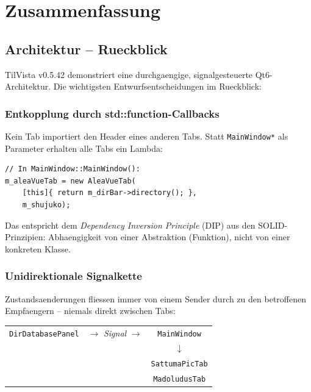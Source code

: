 \chapter{Zusammenfassung}

\section{Architektur -- Rueckblick}

TilVista v0.5.42 demonstriert eine durchgaengige,
signalgesteuerte Qt6-Architektur. Die wichtigsten
Entwurfsentscheidungen im Rueckblick:

\subsection{Entkopplung durch std::function-Callbacks}

Kein Tab importiert den Header eines anderen Tabs.
Statt \verb|MainWindow*| als Parameter erhalten alle
Tabs ein Lambda:

\begin{lstlisting}
// In MainWindow::MainWindow():
m_aleaVueTab = new AleaVueTab(
    [this]{ return m_dirBar->directory(); },
    m_shujuko);
\end{lstlisting}

Das entspricht dem \emph{Dependency Inversion Principle}
(DIP) aus den SOLID-Prinzipien: Abhaengigkeit von einer
Abstraktion (Funktion), nicht von einer konkreten Klasse.

\subsection{Unidirektionale Signalkette}

Zustandsaenderungen fliessen immer von einem Sender
durch  zu den betroffenen Empfaengern
-- niemals direkt zwischen Tabs:

\begin{center}
\small
\begin{tabular}{ccc}
\texttt{DirDatabasePanel} &
\(\longrightarrow\) \textit{Signal} \(\longrightarrow\) &
\texttt{MainWindow} \\
& & \(\downarrow\) \\
& & \texttt{SattumaPicTab} \\
& & \texttt{MadoludusTab} \\
\end{tabular}
\end{center}

